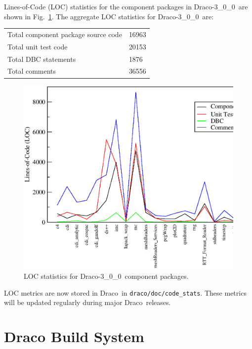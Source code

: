 \documentclass[11pt]{../tex/nmemo}
\newcommand{\draco}{Draco}
\newcommand{\dracor}{\draco-3\_0\_0}
\begin{document}
Lines-of-Code (LOC) statistics for the component packages in \dracor\ 
are shown in Fig.~\ref{fig:stats}.  The aggregate LOC statistics for
\dracor\ are:
\begin{center}
  \begin{tabular}{|l|l|} \hline
    Total component package source code & 16963 \\
    Total unit test code & 20153 \\
    Total DBC statements & 1876 \\
    Total comments & 36556 \\
    \hline
  \end{tabular}
\end{center}
\begin{figure}
  \label{fig:stats}
  \centerline{
    \includegraphics[width=6in]{loc-3_0_0.eps}}
  \caption{LOC statistics for \dracor\ component packages.}
\end{figure}

LOC metrics are now stored in \draco\ in
\texttt{draco/doc/code\_stats}.  These metrics will be updated
regularly during major \draco\ releases.


\section{Draco Build System}
\end{document}
